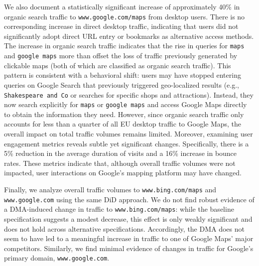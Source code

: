 \documentclass[11pt]{article}
\begin{document}
	
	We also document a statistically significant increase of approximately 40\% in organic search traffic to \texttt{www.google.com/maps} from desktop users. There is no corresponding increase in direct desktop traffic, indicating that users did not significantly adopt direct URL entry or bookmarks as alternative access methods. The increase in organic search traffic indicates that the rise in queries for \texttt{maps} and \texttt{google maps} more than offset the loss of traffic previously generated by clickable maps (both of which are classified as organic search traffic). This pattern is consistent with a behavioral shift: users may have stopped entering queries on Google Search that previously triggered geo-localized results (e.g., \texttt{Shakespeare and Co} or searches for specific shops and attractions). Instead, they now search explicitly for \texttt{maps} or \texttt{google maps} and access Google Maps directly to obtain the information they need. However, since organic search traffic only accounts for less than a quarter of all EU desktop traffic to Google Maps, the overall impact on total traffic volumes remains limited. Moreover, examining user engagement metrics reveals subtle yet significant changes. Specifically, there is a 5\% reduction in the average duration of visits and a 16\% increase in bounce rates. These metrics indicate that, although overall traffic volumes were not impacted, user interactions on Google’s mapping platform may have changed.
	
	Finally, we analyze overall traffic volumes to \texttt{www.bing.com/maps} and \texttt{www.google.com} using the same DiD approach. We do not find robust evidence of a DMA-induced change in traffic to \texttt{www.bing.com/maps}: while the baseline specification suggests a modest decrease, this effect is only weakly significant and does not hold across alternative specifications. Accordingly, the DMA does not seem to have led to a meaningful increase in traffic to one of Google Maps’ major competitors. Similarly, we find minimal evidence of changes in traffic for Google’s primary domain, \texttt{www.google.com}.
	
\end{document}
